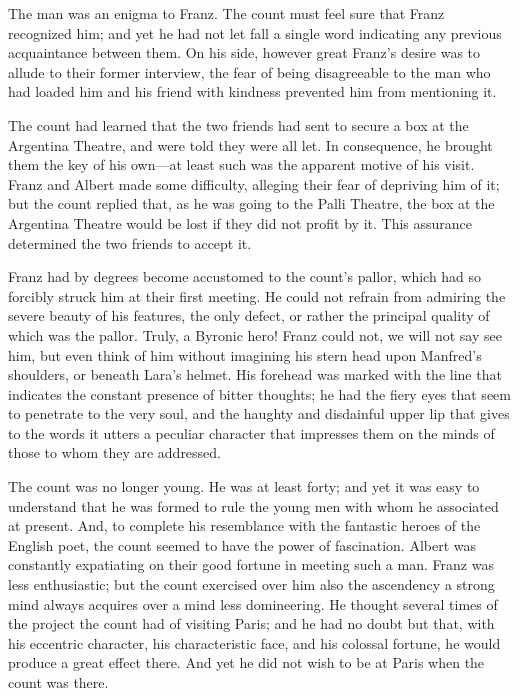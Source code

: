  The man was an enigma to Franz. The count must feel sure that Franz recognized him; and yet he had not let fall a single word indicating any previous acquaintance between them. On his side, however great Franz's desire was to allude to their former interview, the fear of being disagreeable to the man who had loaded him and his friend with kindness prevented him from mentioning it. 

 The count had learned that the two friends had sent to secure a box at the Argentina Theatre, and were told they were all let. In consequence, he brought them the key of his own—at least such was the apparent motive of his visit. Franz and Albert made some difficulty, alleging their fear of depriving him of it; but the count replied that, as he was going to the Palli Theatre, the box at the Argentina Theatre would be lost if they did not profit by it. This assurance determined the two friends to accept it. 

 Franz had by degrees become accustomed to the count's pallor, which had so forcibly struck him at their first meeting. He could not refrain from admiring the severe beauty of his features, the only defect, or rather the principal quality of which was the pallor. Truly, a Byronic hero! Franz could not, we will not say see him, but even think of him without imagining his stern head upon Manfred's shoulders, or beneath Lara's helmet. His forehead was marked with the line that indicates the constant presence of bitter thoughts; he had the fiery eyes that seem to penetrate to the very soul, and the haughty and disdainful upper lip that gives to the words it utters a peculiar character that impresses them on the minds of those to whom they are addressed. 

 The count was no longer young. He was at least forty; and yet it was easy to understand that he was formed to rule the young men with whom he associated at present. And, to complete his resemblance with the fantastic heroes of the English poet, the count seemed to have the power of fascination. Albert was constantly expatiating on their good fortune in meeting such a man. Franz was less enthusiastic; but the count exercised over him also the ascendency a strong mind always acquires over a mind less domineering. He thought several times of the project the count had of visiting Paris; and he had no doubt but that, with his eccentric character, his characteristic face, and his colossal fortune, he would produce a great effect there. And yet he did not wish to be at Paris when the count was there. 

